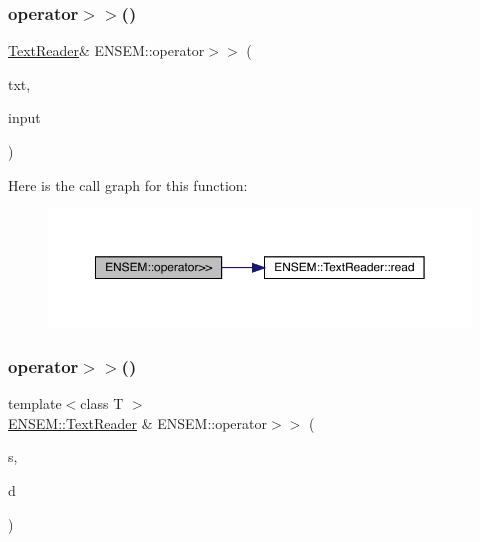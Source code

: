 \subsubsection{\texorpdfstring{operator$>$$>$()}{operator>>()}\hspace{0.1cm}{\footnotesize\ttfamily [1/7]}}
{\footnotesize\ttfamily \mbox{\hyperlink{classENSEM_1_1TextReader}{Text\+Reader}}\& E\+N\+S\+E\+M\+::operator$>$$>$ (\begin{DoxyParamCaption}\item[{\mbox{\hyperlink{classENSEM_1_1TextReader}{Text\+Reader}} \&}]{txt,  }\item[{string \&}]{input }\end{DoxyParamCaption})}

Here is the call graph for this function\+:\nopagebreak
\begin{figure}[H]
\begin{center}
\leavevmode
\includegraphics[width=350pt]{d2/d94/namespaceENSEM_aa252c4dc795051b8bd8067eda747daa6_cgraph}
\end{center}
\end{figure}
\mbox{\label{namespaceENSEM_a50e3d2025db65f9542e1c884553a842b}} 
\subsubsection{\texorpdfstring{operator$>$$>$()}{operator>>()}\hspace{0.1cm}{\footnotesize\ttfamily [2/7]}}
{\footnotesize\ttfamily template$<$class T $>$ \\
\mbox{\hyperlink{classENSEM_1_1TextReader}{E\+N\+S\+E\+M\+::\+Text\+Reader}} \& E\+N\+S\+E\+M\+::operator$>$$>$ (\begin{DoxyParamCaption}\item[{\mbox{\hyperlink{classENSEM_1_1TextReader}{E\+N\+S\+E\+M\+::\+Text\+Reader}} \&}]{s,  }\item[{\mbox{\hyperlink{classENSEM_1_1EScalar}{E\+Scalar}}$<$ \mbox{\hyperlink{classENSEM_1_1OScalar}{O\+Scalar}}$<$ T $>$ $>$ \&}]{d }\end{DoxyParamCaption})\hspace{0.3cm}{\ttfamily [inline]}}




